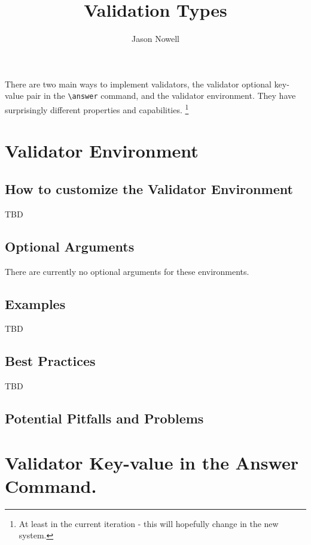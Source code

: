 \documentclass{ximera}
\title{Validation Types}
\author{Jason Nowell}
\begin{document}
\begin{abstract}
\end{abstract}
\maketitle

There are two main ways to implement validators, the validator optional key-value pair in the \verb|\answer| command, and the validator environment. They have surprisingly different properties and capabilities.%
\footnote{At least in the current iteration - this will hopefully change in the new system.}

\section*{Validator Environment}
    \subsection*{How to customize the Validator Environment}
        TBD
        
    \subsection*{Optional Arguments}
        There are currently no optional arguments for these environments.

    \subsection*{Examples}
    
        TBD
        
    \subsection*{Best Practices}
    
        TBD
        
    
    \subsection*{Potential Pitfalls and Problems}
    


\section*{Validator Key-value in the Answer Command.}
\end{document}
